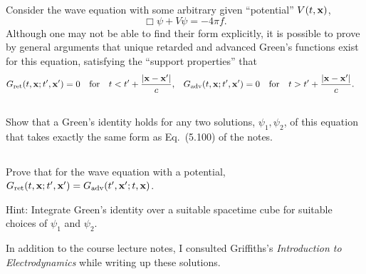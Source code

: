 \documentclass[11pt]{article}
\newcommand{\vfix}{\vspace{-\baselineskip}}
\newcommand{\beq}{\begin{equation*}}
\newcommand{\eeq}{\end{equation*}}
\newenvironment{statement}[1]
{
	\section{#1}
	\color{darkgray}
	\ignorespaces
}
{
}
\newenvironment{problem}
{
	\subsection{}
	\color{darkgray}
    \ignorespaces
}
{

}
\begin{document}
\newcommand{\adv}{\text{adv}}
\newcommand{\Gadv}{G_\adv}
\newcommand{\Gret}{G_\ret}

\newcommand{\psiq}{\psi_1}
\newcommand{\psiw}{\psi_2}
 
\begin{statement}{}
	Consider the wave equation with some arbitrary given ``potential'' $V(t, \vb{x})$,
	\beq
		\Box \psi + V \psi = -4\pi f.
	\eeq
	Although one may not be able to find their form explicitly, it is possible to prove by general arguments that unique retarded and advanced Green's functions exist for this equation, satisfying the ``support properties'' that
	\begin{align*}
		\Gret(t, \vx; t', \vx') = 0 &\qfor t < t' + \frac{\abs{\vx - \vx'}}{c}, &
		\Gadv(t, \vx; t', \vx') = 0 &\qfor t > t' + \frac{\abs{\vx - \vx'}}{c}.
	\end{align*}
	\vfix
\end{statement}

\begin{problem}
	Show that a Green's identity holds for any two solutions, $\psiq, \psiw$, of this equation that takes exactly the same form as Eq.~(5.100) of the notes.
\end{problem}

\begin{problem}
	Prove that for the wave equation with a potential, $\Gret(t, \vx; t', \vx') = \Gadv(t', \vx'; t, \vx)$.
	
	Hint: Integrate Green's identity over a suitable spacetime cube for suitable choices of $\psiq$ and $\psiw$.
\end{problem}



\vfill
In addition to the course lecture notes, I consulted Griffiths's \emph{Introduction to Electrodynamics} while writing up these solutions.
\end{document}
